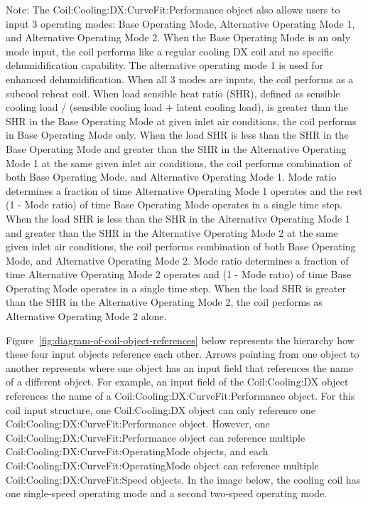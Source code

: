 Note: The Coil:Cooling:DX:CurveFit:Performance object also allows users to input 3 operating modes: Base Operating Mode, Alternative Operating Mode 1, and Alternative Operating Mode 2. When the Base Operating Mode is an only mode input, the coil performs like a regular cooling DX coil and no specific dehumidification capability. The alternative operating mode 1 is used for enhanced dehumidification. When all 3 modes are inputs, the coil performs as a subcool reheat coil. When load sensible heat ratio (SHR), defined as sensible cooling load / (sensible cooling load + latent cooling load), is greater than the SHR in the Base Operating Mode at given inlet air conditions, the coil performs in Base Operating Mode only. When the load SHR is less than the SHR in the Base Operating Mode and greater than the SHR in the Alternative Operating Mode 1 at the same given inlet air conditions, the coil performs combination of both Base Operating Mode, and Alternative Operating Mode 1. Mode ratio determines a fraction of time Alternative Operating Mode 1 operates and the rest (1 - Mode ratio) of time Base Operating Mode operates in a single time step. When the load SHR is less than the SHR in the Alternative Operating Mode 1 and greater than the SHR in the Alternative Operating Mode 2 at the same given inlet air conditions, the coil performs combination of both Base Operating Mode, and Alternative Operating Mode 2. Mode ratio determines a fraction of time Alternative Operating Mode 2 operates and (1 - Mode ratio) of time Base Operating Mode operates in a single time step.  When the load SHR is greater than the SHR in the Alternative Operating Mode 2, the coil performs as Alternative Operating Mode 2 alone.

Figure~\ref{fig:diagram-of-coil-object-references} below represents the hierarchy how these four input objects reference each other. Arrows pointing from one object to another represents where one object has an input field that references the name of a different object. For example, an input field of the Coil:Cooling:DX object references the name of a Coil:Cooling:DX:CurveFit:Performance object. For this coil input structure, one Coil:Cooling:DX object can only reference one Coil:Cooling:DX:CurveFit:Performance object. However, one Coil:Cooling:DX:CurveFit:Performance object can reference multiple Coil:Cooling:DX:CurveFit:OperatingMode objects, and each Coil:Cooling:DX:CurveFit:OperatingMode object can reference multiple Coil:Cooling:DX:CurveFit:Speed objects. In the image below, the cooling coil has one single-speed operating mode and a second two-speed operating mode.

